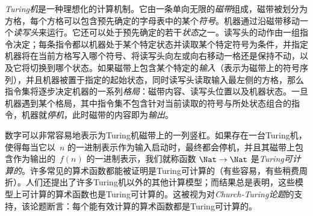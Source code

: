 \emph{Turing机}是一种理想化的计算机制。它由一条单向无限的\emph{磁带}组成，磁带被划分为方格，每个方格可以包含预先确定的字母表中的某个\emph{符号}。机器通过沿磁带移动一个\emph{读写头}来运行。它还可以处于预先确定的若干\emph{状态}之一。读写头的动作由一组指令决定；每条指令都以机器处于某个特定状态并读取某个特定符号为条件，并指定机器将在当前方格写入哪个符号、将读写头向左或向右移动一格还是保持不动，以及它将切换到哪个状态。如果磁带上包含某个特定的\emph{输入}（表示为磁带上的符号序列），并且机器被置于指定的起始状态，同时读写头读取输入最左侧的方格，那么指令集将逐步决定机器的一系列\emph{格局}：磁带内容、读写头位置以及机器状态。一旦机器遇到某个格局，其中指令集不包含针对当前读取的符号与所处状态组合的指令，机器就\emph{停机}，此时磁带的内容即为\emph{输出}。

数字可以非常容易地表示为Turing机磁带上的一列竖杠。如果存在一台Turing机，使得每当它以~$n$ 的一进制表示作为输入启动时，最终都会停机，并且其磁带上包含作为输出的~$f(n)$ 的一进制表示，我们就称函数 $\Nat \to \Nat$ 是\emph{Turing可计算的}。许多常见的算术函数都能被证明是Turing可计算的（有些容易，有些稍费周折）。人们还提出了许多Turing机以外的其他计算模型；而结果总是表明，这些模型上可计算的算术函数也是Turing可计算的。这被视为对\emph{Church-Turing论题}的支持，该论题断言：每个能有效计算的算术函数都是Turing可计算的。